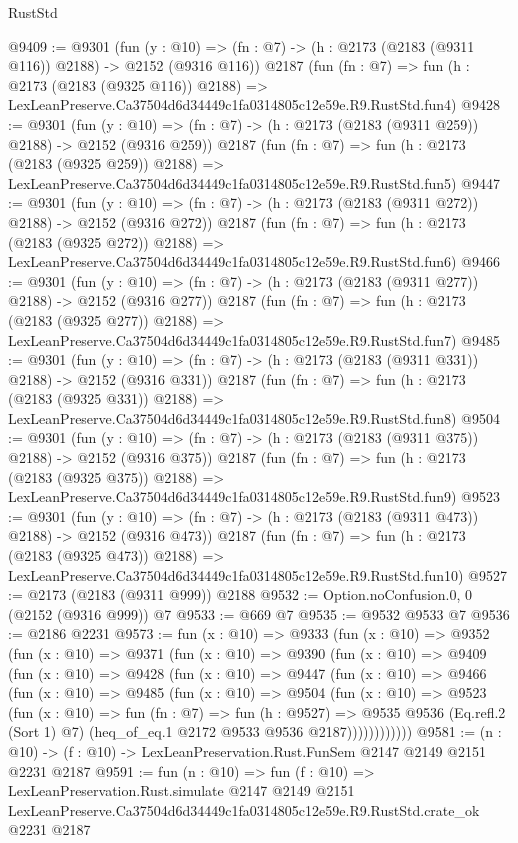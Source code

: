 \begin{lexlean}{RustStd}
\begin{coremodule}
@9409 := @9301
    (fun (y : @10) => (fn : @7) -> (h : @2173 (@2183 (@9311 @116)) @2188) -> @2152 (@9316 @116))
    @2187
    (fun (fn : @7) =>
    fun (h : @2173 (@2183 (@9325 @116)) @2188) =>
    LexLeanPreserve.Ca37504d6d34449c1fa0314805c12e59e.R9.RustStd.fun4)
@9428 := @9301
    (fun (y : @10) => (fn : @7) -> (h : @2173 (@2183 (@9311 @259)) @2188) -> @2152 (@9316 @259))
    @2187
    (fun (fn : @7) =>
    fun (h : @2173 (@2183 (@9325 @259)) @2188) =>
    LexLeanPreserve.Ca37504d6d34449c1fa0314805c12e59e.R9.RustStd.fun5)
@9447 := @9301
    (fun (y : @10) => (fn : @7) -> (h : @2173 (@2183 (@9311 @272)) @2188) -> @2152 (@9316 @272))
    @2187
    (fun (fn : @7) =>
    fun (h : @2173 (@2183 (@9325 @272)) @2188) =>
    LexLeanPreserve.Ca37504d6d34449c1fa0314805c12e59e.R9.RustStd.fun6)
@9466 := @9301
    (fun (y : @10) => (fn : @7) -> (h : @2173 (@2183 (@9311 @277)) @2188) -> @2152 (@9316 @277))
    @2187
    (fun (fn : @7) =>
    fun (h : @2173 (@2183 (@9325 @277)) @2188) =>
    LexLeanPreserve.Ca37504d6d34449c1fa0314805c12e59e.R9.RustStd.fun7)
@9485 := @9301
    (fun (y : @10) => (fn : @7) -> (h : @2173 (@2183 (@9311 @331)) @2188) -> @2152 (@9316 @331))
    @2187
    (fun (fn : @7) =>
    fun (h : @2173 (@2183 (@9325 @331)) @2188) =>
    LexLeanPreserve.Ca37504d6d34449c1fa0314805c12e59e.R9.RustStd.fun8)
@9504 := @9301
    (fun (y : @10) => (fn : @7) -> (h : @2173 (@2183 (@9311 @375)) @2188) -> @2152 (@9316 @375))
    @2187
    (fun (fn : @7) =>
    fun (h : @2173 (@2183 (@9325 @375)) @2188) =>
    LexLeanPreserve.Ca37504d6d34449c1fa0314805c12e59e.R9.RustStd.fun9)
@9523 := @9301
    (fun (y : @10) => (fn : @7) -> (h : @2173 (@2183 (@9311 @473)) @2188) -> @2152 (@9316 @473))
    @2187
    (fun (fn : @7) =>
    fun (h : @2173 (@2183 (@9325 @473)) @2188) =>
    LexLeanPreserve.Ca37504d6d34449c1fa0314805c12e59e.R9.RustStd.fun10)
@9527 := @2173 (@2183 (@9311 @999)) @2188
@9532 := Option.noConfusion.{0, 0} (@2152 (@9316 @999)) @7
@9533 := @669 @7
@9535 := @9532 @9533 @7
@9536 := @2186 @2231
@9573 := fun (x : @10) =>
  @9333
    (fun (x : @10) =>
    @9352
      (fun (x : @10) =>
      @9371
        (fun (x : @10) =>
        @9390
          (fun (x : @10) =>
          @9409
            (fun (x : @10) =>
            @9428
              (fun (x : @10) =>
              @9447
                (fun (x : @10) =>
                @9466
                  (fun (x : @10) =>
                  @9485
                    (fun (x : @10) =>
                    @9504
                      (fun (x : @10) =>
                      @9523
                        (fun (x : @10) =>
                        fun (fn : @7) =>
                        fun (h : @9527) =>
                        @9535
                          @9536
                          (Eq.refl.{2} (Sort 1) @7)
                          (heq_of_eq.{1} @2172 @9533 @9536 @2187))))))))))))
@9581 := (n : @10) -> (f : @10) -> LexLeanPreservation.Rust.FunSem @2147 @2149 @2151 @2231 @2187
@9591 := fun (n : @10) =>
  fun (f : @10) =>
  LexLeanPreservation.Rust.simulate
    @2147
    @2149
    @2151
    LexLeanPreserve.Ca37504d6d34449c1fa0314805c12e59e.R9.RustStd.crate_ok
    @2231
    @2187
\end{coremodule}
\end{lexlean}
